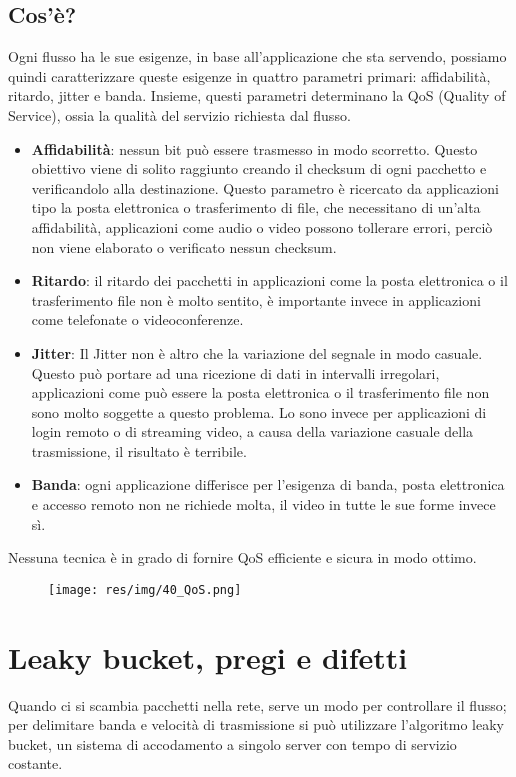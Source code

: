 \subsection{Cos'è?}
Ogni flusso ha le sue esigenze, in base all'applicazione che sta servendo, possiamo quindi caratterizzare queste esigenze in quattro parametri primari: affidabilità, ritardo, jitter e banda. Insieme, questi parametri determinano la QoS (Quality of Service), ossia la qualità del servizio richiesta dal flusso.
\begin{itemize}
\item	\textbf{Affidabilità}: nessun bit può essere trasmesso in modo scorretto. Questo obiettivo viene di solito raggiunto creando il checksum di ogni pacchetto e verificandolo alla destinazione. Questo parametro è ricercato da applicazioni tipo la posta elettronica o trasferimento di file, che necessitano di un'alta affidabilità, applicazioni come audio o video possono tollerare errori, perciò non viene elaborato o verificato nessun checksum.
\item	\textbf{Ritardo}: il ritardo dei pacchetti in applicazioni come la posta elettronica o il trasferimento file non è molto sentito, è importante invece in applicazioni come telefonate o videoconferenze.
\item	\textbf{Jitter}: Il Jitter non è altro che la variazione del segnale in modo casuale. Questo può portare ad una ricezione di dati in intervalli irregolari, applicazioni come può essere la posta elettronica o il trasferimento file non sono molto soggette a questo problema. Lo sono invece per applicazioni di login remoto o di streaming video, a causa della variazione casuale della trasmissione, il risultato è terribile.
\item	\textbf{Banda}: ogni applicazione differisce per l'esigenza di banda, posta elettronica e accesso remoto non ne richiede molta, il video in tutte le sue forme invece sì.
\end{itemize}
Nessuna tecnica è in grado di fornire QoS efficiente e sicura in modo ottimo. 

\begin{figure}[H]
\centering
\texttt{[image: res/img/40\_QoS.png]}
\end{figure}

\section{Leaky bucket, pregi e difetti}

Quando ci si scambia pacchetti nella rete, serve un modo per controllare il flusso; per delimitare banda e velocità di trasmissione si può utilizzare l'algoritmo leaky bucket, un sistema di accodamento a singolo server con tempo di servizio costante.
